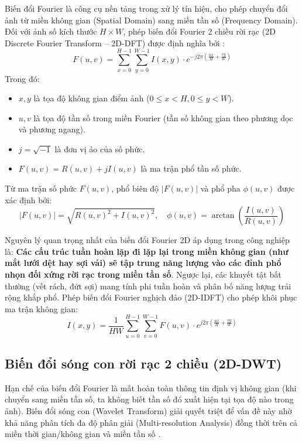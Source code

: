Biến đổi Fourier là công cụ nền tảng trong xử lý tín hiệu, cho phép chuyển đổi ảnh từ miền không gian (Spatial Domain) sang miền tần số (Frequency Domain). Đối với ảnh số kích thước $H \times W$, phép biến đổi Fourier 2 chiều rời rạc (2D Discrete Fourier Transform -- 2D-DFT) được định nghĩa bởi \cite{gonzalez2018}:
\begin{equation}
    F(u, v) = \sum_{x=0}^{H-1} \sum_{y=0}^{W-1} I(x, y) \cdot e^{-j 2\pi \left(\frac{ux}{H} + \frac{vy}{W}\right)}
\end{equation}
Trong đó:
\begin{itemize}
    \item $x, y$ là tọa độ không gian điểm ảnh ($0 \le x < H, 0 \le y < W$).
    \item $u, v$ là tọa độ tần số trong miền Fourier (tần số không gian theo phương dọc và phương ngang).
    \item $j = \sqrt{-1}$ là đơn vị ảo của số phức.
    \item $F(u, v) = R(u, v) + j I(u, v)$ là ma trận phổ tần số phức.
\end{itemize}

Từ ma trận số phức $F(u, v)$, phổ biên độ $|F(u, v)|$ và phổ pha $\phi(u, v)$ được xác định bởi:
\begin{equation}
    |F(u, v)| = \sqrt{R(u, v)^2 + I(u, v)^2}, \quad \phi(u, v) = \arctan\left(\frac{I(u, v)}{R(u, v)}\right)
\end{equation}

Nguyên lý quan trọng nhất của biến đổi Fourier 2D áp dụng trong công nghiệp là: \textbf{Các cấu trúc tuần hoàn lặp đi lặp lại trong miền không gian (như mắt lưới dệt hay sợi vải) sẽ tập trung năng lượng vào các đỉnh phổ nhọn đối xứng rời rạc trong miền tần số}. Ngược lại, các khuyết tật bất thường (vết rách, đứt sợi) mang tính phi tuần hoàn và phân bố năng lượng trải rộng khắp phổ. Phép biến đổi Fourier nghịch đảo (2D-IDFT) cho phép khôi phục ma trận không gian:
\begin{equation}
    I(x, y) = \frac{1}{HW} \sum_{u=0}^{H-1} \sum_{v=0}^{W-1} F(u, v) \cdot e^{j 2\pi \left(\frac{ux}{H} + \frac{vy}{W}\right)}
\end{equation}

\subsection{Biến đổi sóng con rời rạc 2 chiều (2D-DWT)}

Hạn chế của biến đổi Fourier là mất hoàn toàn thông tin định vị không gian (khi chuyển sang miền tần số, ta không biết tần số đó xuất hiện tại tọa độ nào trong ảnh). Biến đổi sóng con (Wavelet Transform) giải quyết triệt để vấn đề này nhờ khả năng phân tích đa độ phân giải (Multi-resolution Analysis) đồng thời trên cả miền thời gian/không gian và miền tần số \cite{mallat2008}.

